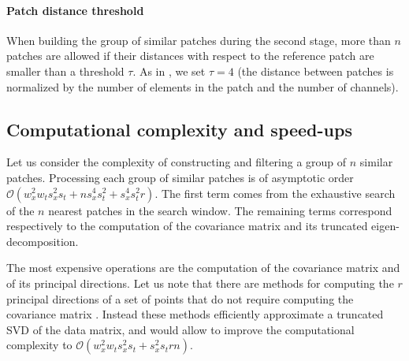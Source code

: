 \documentclass[10pt, journal, twocolumn, final, a4paper]{IEEEtran}
\begin{document}

\paragraph{Patch distance threshold} When building the group of similar
patches during the second stage, more than $n$ patches are allowed
if their distances with respect to the reference patch are smaller than a
threshold $\tau$.  As in \cite{Lebrun2013ipol}, we set $\tau = 4$ (the distance between
patches is normalized by the number of elements in the patch and the number of
channels).


\subsection{Computational complexity and speed-ups}
\label{sse:complexity}

Let us consider the complexity of constructing and filtering a group of
$n$ similar patches.
Processing each group of similar patches is of asymptotic order $\mathcal
O(w_x^2 w_t s_x^2 s_t + ns_x^4s_t^2 + s_x^4s_t^2r)$.
The first term comes from the exhaustive search of the $n$ nearest patches in
the search window.  The remaining terms correspond respectively to the
computation of the covariance matrix and its truncated eigen-decomposition.

The most expensive operations are the computation of the covariance matrix and
of its principal directions.
Let us note that there are methods for computing the $r$ principal directions
of a set of points that do not require computing the covariance matrix
\cite{Halko2011}. Instead these methods efficiently approximate a truncated SVD
of the data matrix, and would 
allow to improve the computational complexity to $\mathcal O(w_x^2 w_t s_x^2
s_t + s_x^2s_trn)$.
\end{document}
